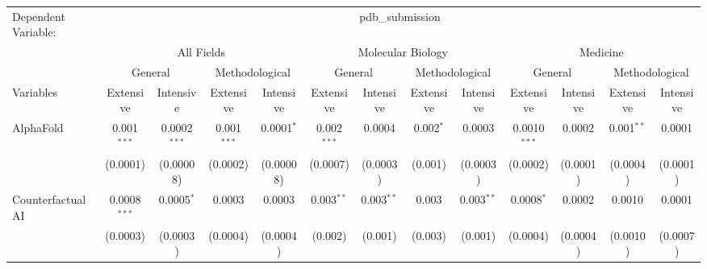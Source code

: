 \begingroup
\centering
\begin{tabular}{lcccccccccccc}
   \tabularnewline \midrule \midrule
   Dependent Variable: & \multicolumn{12}{c}{pdb\_submission}\\
 & \multicolumn{4}{c}{All Fields} & \multicolumn{4}{c}{Molecular Biology} & \multicolumn{4}{c}{Medicine} \\
\cmidrule(lr){2-5} \cmidrule(lr){6-9} \cmidrule(lr){10-13}
 & \multicolumn{2}{c}{General} & \multicolumn{2}{c}{Methodological} & \multicolumn{2}{c}{General} & \multicolumn{2}{c}{Methodological} & \multicolumn{2}{c}{General} & \multicolumn{2}{c}{Methodological} \\
\cmidrule(lr){2-3} \cmidrule(lr){4-5} \cmidrule(lr){6-7} \cmidrule(lr){8-9} \cmidrule(lr){10-11} \cmidrule(lr){12-13}
Variables & \multicolumn{1}{c}{Extensive} & \multicolumn{1}{c}{Intensive} & \multicolumn{1}{c}{Extensive} & \multicolumn{1}{c}{Intensive} & \multicolumn{1}{c}{Extensive} & \multicolumn{1}{c}{Intensive} & \multicolumn{1}{c}{Extensive} & \multicolumn{1}{c}{Intensive} & \multicolumn{1}{c}{Extensive} & \multicolumn{1}{c}{Intensive} & \multicolumn{1}{c}{Extensive} & \multicolumn{1}{c}{Intensive} \\
\cmidrule(lr){1-1}\cmidrule(lr){2-2} \cmidrule(lr){3-3} \cmidrule(lr){4-4} \cmidrule(lr){5-5} \cmidrule(lr){6-6} \cmidrule(lr){7-7} \cmidrule(lr){8-8} \cmidrule(lr){9-9} \cmidrule(lr){10-10} \cmidrule(lr){11-11} \cmidrule(lr){12-12} \cmidrule(lr){13-13}
   AlphaFold                                & 0.001$^{***}$  & 0.0002$^{***}$  & 0.001$^{***}$ & 0.0001$^{*}$   & 0.002$^{***}$ & 0.0004          & 0.002$^{*}$   & 0.0003         & 0.0010$^{***}$ & 0.0002     & 0.001$^{**}$ & 0.0001\\   
                                            & (0.0001)       & (0.00008)       & (0.0002)      & (0.00008)      & (0.0007)      & (0.0003)        & (0.001)       & (0.0003)       & (0.0002)       & (0.0001)   & (0.0004)     & (0.0001)\\   
   Counterfactual AI                        & 0.0008$^{***}$ & 0.0005$^{*}$    & 0.0003        & 0.0003         & 0.003$^{**}$  & 0.003$^{**}$    & 0.003         & 0.003$^{**}$   & 0.0008$^{*}$   & 0.0002     & 0.0010       & 0.0001\\   
                                            & (0.0003)       & (0.0003)        & (0.0004)      & (0.0004)       & (0.002)       & (0.001)         & (0.003)       & (0.001)        & (0.0004)       & (0.0004)   & (0.0010)     & (0.0007)\\   

\end{tabular}
